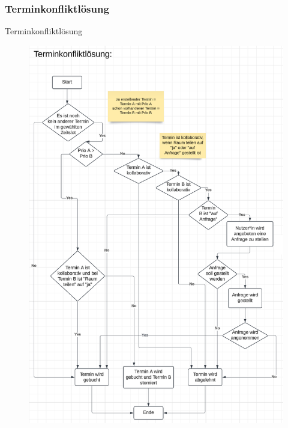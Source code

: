 \documentclass{sdqbeamer}
\begin{document}
\subsubsection{Terminkonfliktlösung}
\begin{frame}{Terminkonfliktlösung}
    \begin{figure}
        \centering
        \includegraphics[width=\textwidth]{pictures/figures/activity/terminkonfliktloesung} %
        \label{fig:terminkonflikt}
    \end{figure}
\end{frame}
\end{document}
